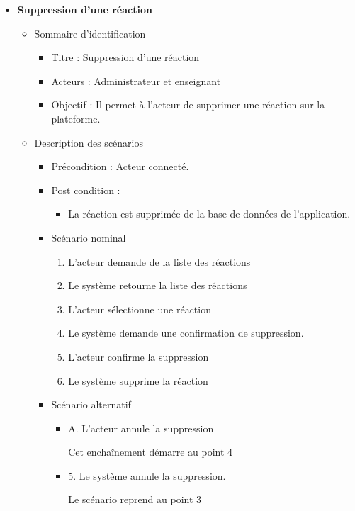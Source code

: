 \begin{itemize}
	\item \textbf{Suppression d’une réaction }
	\begin{itemize}
		\item Sommaire d’identification
		\begin{itemize}
			\item Titre : Suppression d’une réaction 
			\item Acteurs : Administrateur et enseignant 
			\item Objectif : Il permet à l’acteur de supprimer une réaction sur la plateforme.
		\end{itemize}
		\item Description des scénarios
		\begin{itemize}
			\item Précondition : Acteur connecté.
			\item Post condition :
			\begin{itemize}
				\item La réaction est supprimée de la base de données de l’application. 
			\end{itemize}
			\item Scénario nominal 
			\begin{enumerate}
				\item L’acteur demande de la liste des réactions
				\item Le système retourne la liste des réactions
				\item L’acteur sélectionne une réaction
				\item Le système demande une confirmation de suppression. 
				\item L’acteur confirme la suppression
				\item Le système supprime la réaction
			\end{enumerate}
			\item Scénario alternatif
			\begin{itemize}
				\item A. L’acteur annule la suppression 
				
				Cet enchaînement démarre au point 4 

				\item 5. Le système annule la suppression. 
				
				Le scénario reprend au point 3 
			\end{itemize}
		\end{itemize}
	\end{itemize}
\end{itemize}

